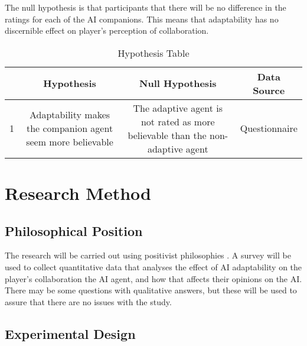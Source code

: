 \documentclass{IEEEtran}
\begin{document}
The null hypothesis is that participants that there will be no difference in the ratings for each of the AI companions. This means that adaptability has no discernible effect on player’s perception of collaboration.

\begin{table}[h!]
  \begin{center}
    \caption{\newline{}Hypothesis Table}
    \label{tab:table1}
    \begin{tabular}{|c|c|c|c|}
      \textbf{ } & \textbf{Hypothesis} & \textbf{Null Hypothesis} & \textbf{Data Source}\\
      \hline
      1 & 
      Adaptability makes the companion agent seem more believable & 
      The adaptive agent is not rated as more believable than the non-adaptive agent &
      Questionnaire\\
    \end{tabular}
  \end{center}
\end{table}

\section{Research Method}
\label{ResearchMethod}

\subsection{Philosophical Position}
\label{PhilosophicalPosition}

The research will be carried out using positivist philosophies \cite{Zukauskas18}. A survey will be used to collect quantitative data that analyses the effect of AI adaptability on the player's collaboration the AI agent, and how that affects their opinions on the AI. There may be some questions with qualitative answers, but these will be used to assure that there are no issues with the study.

\subsection{Experimental Design}
\label{ExperimentalDesign}


\end{document}
